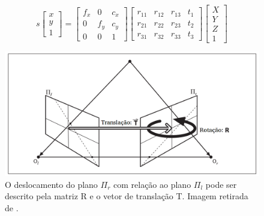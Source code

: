 \begin{equation}
\label{projection_equation}
s
\begin{bmatrix}
x \\ 
y \\ 
1 
\end{bmatrix}
= 
\begin{bmatrix}
f_x & 0 & c_x\\ 
0 & f_y & c_y\\ 
0 & 0 & 1
\end{bmatrix} 
\begin{bmatrix}
r_{11} & r_{12} & r_{13} & t_1 \\ 
r_{21} & r_{22} & r_{23} & t_2 \\ 
r_{31} & r_{32} & r_{33} & t_3
\end{bmatrix}
\begin{bmatrix}
X \\ 
Y \\ 
Z \\ 
1
\end{bmatrix}
\end{equation}

\begin{figure}[H]
 	\centering
 	\includegraphics[scale=0.25]{./Resources/bradski/essential_geometry_ptbr.png}
 	\caption{O deslocamento do plano $\Pi_r$ com relação ao plano $\Pi_l$ pode ser descrito pela matriz R e o vetor de translação T. Imagem retirada de \cite{Bradski2008}.}
 	\label{essential_geometry.png}
\end{figure}

